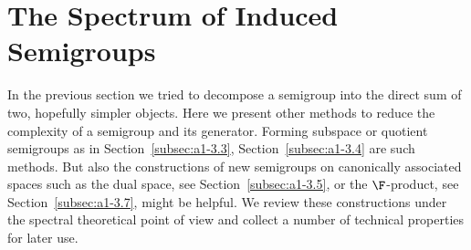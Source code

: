 
\section{The Spectrum of Induced Semigroups}\label{sec:a3-4}
In the previous section we tried to decompose a semigroup into the direct sum of two, hopefully simpler objects.
Here we present other methods to reduce the complexity of a semigroup and its generator.
Forming subspace or quotient semigroups as in Section~\ref{subsec:a1-3.3}, Section~\ref{subsec:a1-3.4} are such methods.
But also the constructions of new semigroups on canonically associated spaces such as the dual space, see Section~\ref{subsec:a1-3.5}, or the $\F$-product, see Section~\ref{subsec:a1-3.7}, might be helpful.
We review these constructions under the spectral theoretical point of view and collect a number of technical properties for later use.

